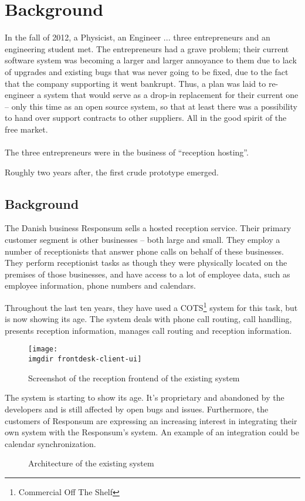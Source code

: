 \chapter{Background}
In the fall of 2012, a Physicist, an Engineer ... three entrepreneurs and an engineering student met. The entrepreneurs had a grave problem; their current software system was becoming a larger and larger annoyance to them due to lack of upgrades and existing bugs that was never going to be fixed, due to the fact that the company supporting it went bankrupt. Thus, a plan was laid to re-engineer a system that would serve as a drop-in replacement for their current one -- only this time as an open source system, so that at least there was a possibility to hand over support contracts to other suppliers. All in the good spirit of the free market.\\\\
The three entrepreneurs were in the business of ``reception hosting''.

Roughly two years after, the first crude prototype emerged.


\section{Background}
The Danish business Responsum sells a hosted reception service. Their primary customer segment is other businesses -- both large and small. They employ a number of receptionists that answer phone calls on behalf of these businesses. They perform receptionist tasks as though they were physically located on the premises of those businesses, and have access to a lot of employee data, such as employee information, phone numbers and calendars.

Throughout the last ten years, they have used a COTS\footnote{Commercial Off The Shelf} system for this task, but is now showing its age. The system deals with phone call routing, call handling, presents reception information, manages call routing and reception information.
\begin{figure}[ht]
\centering
\texttt{[image: \\imgdir frontdesk-client-ui]}
\caption{Screenshot of the reception frontend of the existing system}
\label{fig:frontdesk_screenshot}
\end{figure}
The system is starting to show its age. It's proprietary and abandoned by the developers and is still affected by open bugs and issues. Furthermore, the customers of Responsum are expressing an increasing interest in integrating their own system with the Responsum's system. An example of an integration could be calendar synchronization.

\begin{figure}[ht]
\centering
\caption{Architecture of the existing system}
\label{fig:frontdesk_architecture}
\end{figure}

